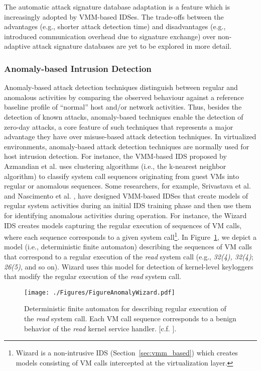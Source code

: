 The automatic attack signature database adaptation is a feature which is increasingly adopted by VMM-based IDSes. The trade-offs between the advantages (e.g., shorter attack detection time) and disadvantages (e.g., introduced communication overhead due to signature exchange) over non-adaptive attack signature databases are yet to be explored in more detail.

\subsubsection{Anomaly-based Intrusion Detection}
\label{sec:anomaly_based}
Anomaly-based attack detection techniques distinguish between regular and anomalous activities by comparing the observed behaviour against a reference baseline profile of ``normal'' host and/or network activities.  Thus, besides the detection of known attacks, anomaly-based techniques enable the detection of zero-day attacks, a core feature of such techniques that represents a major advantage they have over misuse-based attack detection techniques. In virtualized environments, anomaly-based attack detection techniques are normally used for host intrusion detection. For instance, the VMM-based IDS proposed by Azmandian et al. \cite{azmandian:virtual} uses clustering algorithms (i.e., the k-nearest neighbor algorithm) to classify system call sequences originating from guest VMs into regular or anomalous sequences. Some researchers, for example, Srivastava et al. \cite{srivastava:secure} and Nascimento et al. \cite{nascimento:anomaly_based}, have designed VMM-based IDSes that create models of regular system activities during an initial IDS training phase and then use them for identifying anomalous activities during operation. For instance, the Wizard IDS \cite{srivastava:secure} creates models capturing the regular execution of sequences of VM calls, where each sequence corresponds to a given system call\footnote{Wizard \cite{srivastava:secure} is a non-intrusive IDS (Section~\ref{sec:vmm_based}) which creates models consisting of VM calls intercepted at the virtualization layer.}. In Figure~\ref{fig:wizard_anomaly}, we depict a model (i.e., deterministic finite automaton) describing the sequences of VM calls that correspond to a regular execution of the \emph{read} system call (e.g., \emph{32(4), 32(4)}; \emph{26(5)}, and so on). Wizard \cite{srivastava:secure} uses this model for detection of kernel-level keyloggers that modify the regular execution of the \emph{read} system call. 

\begin{figure}[!t]
\centering
\texttt{[image: ./Figures/FigureAnomalyWizard.pdf]}
\caption{Deterministic finite automaton for describing regular execution of the \emph{read} system call. Each VM call sequence corresponds to a benign behavior of the \emph{read} kernel service handler. [c.f. \cite{srivastava:secure}].}
\label{fig:wizard_anomaly}
\end{figure} 

